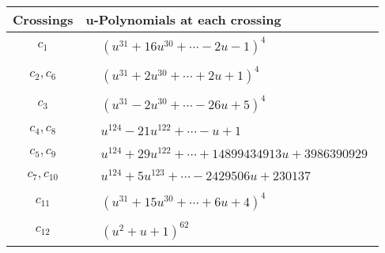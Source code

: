 \documentclass[1p]{elsarticle_modified}
\theoremstyle{definition}
\begin{document}
\begin{tabular}{m{50pt}|m{274pt}}
Crossings & \hspace{64pt}u-Polynomials at each crossing \\
\hline $$\begin{aligned}c_{1}\end{aligned}$$&$\begin{aligned}
&(u^{31}+16 u^{30}+\cdots-2 u-1)^{4}
\end{aligned}$\\
\hline $$\begin{aligned}c_{2},c_{6}\end{aligned}$$&$\begin{aligned}
&(u^{31}+2 u^{30}+\cdots+2 u+1)^{4}
\end{aligned}$\\
\hline $$\begin{aligned}c_{3}\end{aligned}$$&$\begin{aligned}
&(u^{31}-2 u^{30}+\cdots-26 u+5)^{4}
\end{aligned}$\\
\hline $$\begin{aligned}c_{4},c_{8}\end{aligned}$$&$\begin{aligned}
&u^{124}-21 u^{122}+\cdots- u+1
\end{aligned}$\\
\hline $$\begin{aligned}c_{5},c_{9}\end{aligned}$$&$\begin{aligned}
&u^{124}+29 u^{122}+\cdots+14899434913 u+3986390929
\end{aligned}$\\
\hline $$\begin{aligned}c_{7},c_{10}\end{aligned}$$&$\begin{aligned}
&u^{124}+5 u^{123}+\cdots-2429506 u+230137
\end{aligned}$\\
\hline $$\begin{aligned}c_{11}\end{aligned}$$&$\begin{aligned}
&(u^{31}+15 u^{30}+\cdots+6 u+4)^{4}
\end{aligned}$\\
\hline $$\begin{aligned}c_{12}\end{aligned}$$&$\begin{aligned}
&(u^2+u+1)^{62}
\end{aligned}$\\
\hline
\end{tabular}\\~\\
\end{document}
